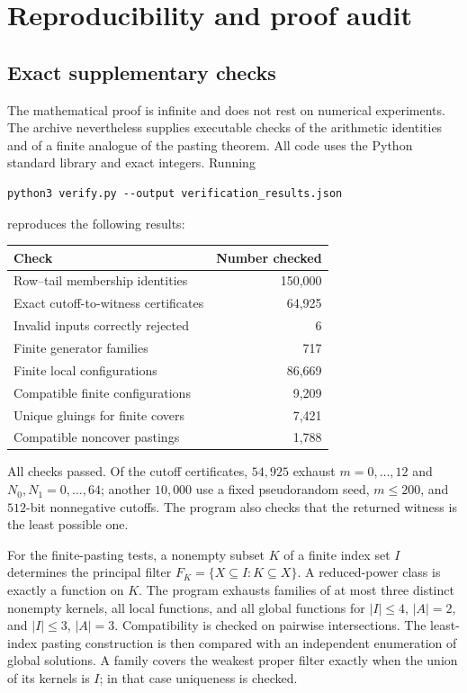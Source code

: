 \documentclass[11pt,letterpaper]{article}
\theoremstyle{definition}
\theoremstyle{remark}
\begin{document}
\section{Reproducibility and proof audit}
\label{sec:audit}

\subsection{Exact supplementary checks}
The mathematical proof is infinite and does not rest on numerical
experiments. The archive nevertheless supplies executable checks of the
arithmetic identities and of a finite analogue of the pasting theorem.
All code uses the Python standard library and exact integers.
Running
\begin{verbatim}
python3 verify.py --output verification_results.json
\end{verbatim}
reproduces the following results:
\begin{center}
\begin{tabular}{lr}
\toprule
Check & Number checked\\
\midrule
Row--tail membership identities & 150,000\\
Exact cutoff-to-witness certificates & 64,925\\
Invalid inputs correctly rejected & 6\\
Finite generator families & 717\\
Finite local configurations & 86,669\\
Compatible finite configurations & 9,209\\
Unique gluings for finite covers & 7,421\\
Compatible noncover pastings & 1,788\\
\bottomrule
\end{tabular}
\end{center}
All checks passed. Of the cutoff certificates, $54,925$ exhaust
$m=0,\ldots,12$ and $N_0,N_1=0,\ldots,64$; another $10,000$ use a
fixed pseudorandom seed, $m\leq200$, and $512$-bit nonnegative
cutoffs. The program also checks that the returned witness is the
least possible one.

For the finite-pasting tests, a nonempty subset $K$ of a finite index
set $I$ determines the principal filter
$F_K=\{X\subseteq I:K\subseteq X\}$. A reduced-power class is
exactly a function on $K$. The program exhausts families of at most
three distinct nonempty kernels, all local functions, and all global
functions for $|I|\leq4$, $|A|=2$, and $|I|\leq3$, $|A|=3$.
Compatibility is checked on pairwise intersections. The least-index
pasting construction is then compared with an independent enumeration
of global solutions. A family covers the weakest proper filter exactly
when the union of its kernels is $I$; in that case uniqueness is checked.
\end{document}
